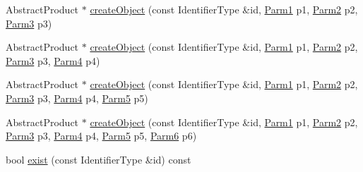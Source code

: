 \begin{DoxyCompactItemize}
\item 
Abstract\+Product $\ast$ \mbox{\hyperlink{classUtil_1_1ObjectFactory_aad312d47c1cd31a138d6e22cc80d398b}{create\+Object}} (const Identifier\+Type \&id, \mbox{\hyperlink{classUtil_1_1ObjectFactory_a47e4f863537be7a4f5f5972691bb0b57}{Parm1}} p1, \mbox{\hyperlink{classUtil_1_1ObjectFactory_ae438d0c17d1510e6fd7db9ac479a371f}{Parm2}} p2, \mbox{\hyperlink{classUtil_1_1ObjectFactory_ae5c679dd2f210e0a5ad257b336f754fb}{Parm3}} p3)
\item 
Abstract\+Product $\ast$ \mbox{\hyperlink{classUtil_1_1ObjectFactory_ab8a1b44d8067c263fce0b4bd94f95ba0}{create\+Object}} (const Identifier\+Type \&id, \mbox{\hyperlink{classUtil_1_1ObjectFactory_a47e4f863537be7a4f5f5972691bb0b57}{Parm1}} p1, \mbox{\hyperlink{classUtil_1_1ObjectFactory_ae438d0c17d1510e6fd7db9ac479a371f}{Parm2}} p2, \mbox{\hyperlink{classUtil_1_1ObjectFactory_ae5c679dd2f210e0a5ad257b336f754fb}{Parm3}} p3, \mbox{\hyperlink{classUtil_1_1ObjectFactory_a052f09d9e81b11d98bb53a52f327cf01}{Parm4}} p4)
\item 
Abstract\+Product $\ast$ \mbox{\hyperlink{classUtil_1_1ObjectFactory_a5d085366c8d5d743bfc1745b02a4f4db}{create\+Object}} (const Identifier\+Type \&id, \mbox{\hyperlink{classUtil_1_1ObjectFactory_a47e4f863537be7a4f5f5972691bb0b57}{Parm1}} p1, \mbox{\hyperlink{classUtil_1_1ObjectFactory_ae438d0c17d1510e6fd7db9ac479a371f}{Parm2}} p2, \mbox{\hyperlink{classUtil_1_1ObjectFactory_ae5c679dd2f210e0a5ad257b336f754fb}{Parm3}} p3, \mbox{\hyperlink{classUtil_1_1ObjectFactory_a052f09d9e81b11d98bb53a52f327cf01}{Parm4}} p4, \mbox{\hyperlink{classUtil_1_1ObjectFactory_a11006cc1ea90957dd8e5604c2d9e069d}{Parm5}} p5)
\item 
Abstract\+Product $\ast$ \mbox{\hyperlink{classUtil_1_1ObjectFactory_a552e3347f54a8ccd4409e718b1e96422}{create\+Object}} (const Identifier\+Type \&id, \mbox{\hyperlink{classUtil_1_1ObjectFactory_a47e4f863537be7a4f5f5972691bb0b57}{Parm1}} p1, \mbox{\hyperlink{classUtil_1_1ObjectFactory_ae438d0c17d1510e6fd7db9ac479a371f}{Parm2}} p2, \mbox{\hyperlink{classUtil_1_1ObjectFactory_ae5c679dd2f210e0a5ad257b336f754fb}{Parm3}} p3, \mbox{\hyperlink{classUtil_1_1ObjectFactory_a052f09d9e81b11d98bb53a52f327cf01}{Parm4}} p4, \mbox{\hyperlink{classUtil_1_1ObjectFactory_a11006cc1ea90957dd8e5604c2d9e069d}{Parm5}} p5, \mbox{\hyperlink{classUtil_1_1ObjectFactory_a9f80d25e0964c0e4c204373cd651397a}{Parm6}} p6)
\item 
bool \mbox{\hyperlink{classUtil_1_1ObjectFactory_acb89fb305fe8ed1a52fa92d1f463d449}{exist}} (const Identifier\+Type \&id) const

\end{DoxyCompactItemize}
